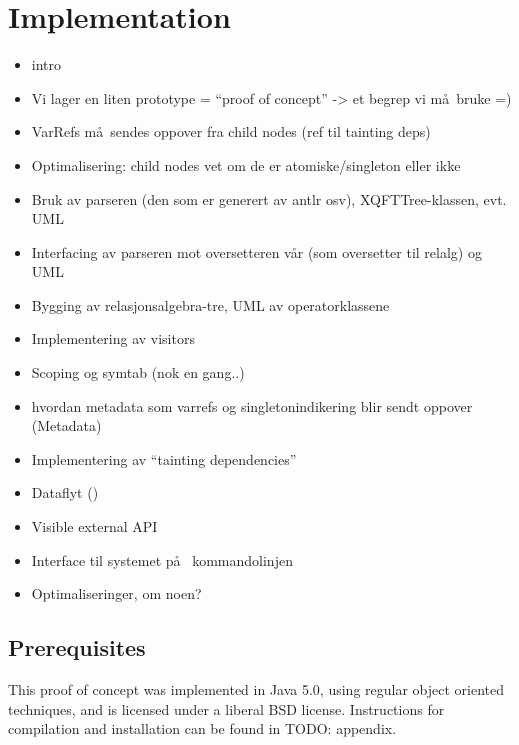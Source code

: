 \chapter{Implementation}
\label{chapter:implementation}

\begin{itemize}
  \item intro
  \item Vi lager en liten prototype = ``proof of concept'' -> et begrep vi m\aa~bruke =)
  \item VarRefs m\aa~sendes oppover fra child nodes (ref til tainting deps)
  \item Optimalisering: child nodes vet om de er atomiske/singleton eller ikke
\end{itemize}

\begin{itemize}
  \item Bruk av parseren (den som er generert av antlr osv), XQFTTree-klassen,
  evt. UML
  \item Interfacing av parseren mot oversetteren v\aa r (som oversetter til
  relalg) og UML
  \item Bygging av relasjonsalgebra-tre, UML av operatorklassene
  \item Implementering av visitors
  \item Scoping og symtab (nok en gang..)
  \item hvordan metadata som varrefs og singletonindikering blir sendt oppover
  (Metadata)
  \item Implementering av ``tainting dependencies''
  \item Dataflyt ()
  \item Visible external API
  \item Interface til systemet p\aa~ kommandolinjen
  \item Optimaliseringer, om noen? 
\end{itemize}

\section{Prerequisites}
This proof of concept was implemented in Java 5.0, using regular object
oriented techniques, and is licensed under a liberal BSD license. Instructions
for compilation and installation can be found in TODO: appendix.






